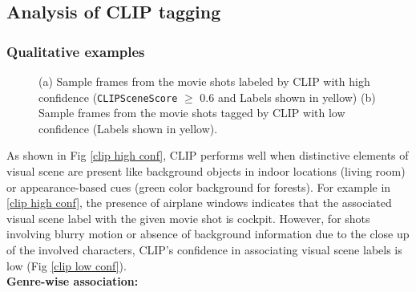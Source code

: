 \subsection{Analysis of CLIP tagging}

\subsubsection{Qualitative examples}

\begin{figure}[h!]
\centering
{}
\caption{(a) Sample frames from the movie shots labeled by CLIP with high confidence (\texttt{CLIPSceneScore} $\geq$ 0.6 and Labels shown in yellow) (b) Sample frames from the movie shots tagged by CLIP with low confidence (Labels shown in yellow).}
\label{combined slulgline and image datasets}
\end{figure}
As shown in Fig \ref{clip high conf}, CLIP performs well when distinctive elements of visual scene are present like background objects in indoor locations (living room) or appearance-based cues (green color background for forests).
For example in  \ref{clip high conf}, the presence of airplane windows indicates that the associated visual scene label with the given movie shot is cockpit. However, for shots involving blurry motion or absence of background information due to the close up of the involved characters, CLIP's confidence in associating visual scene labels is low (Fig \ref{clip low conf}).
\\
\textbf{Genre-wise association:} 
